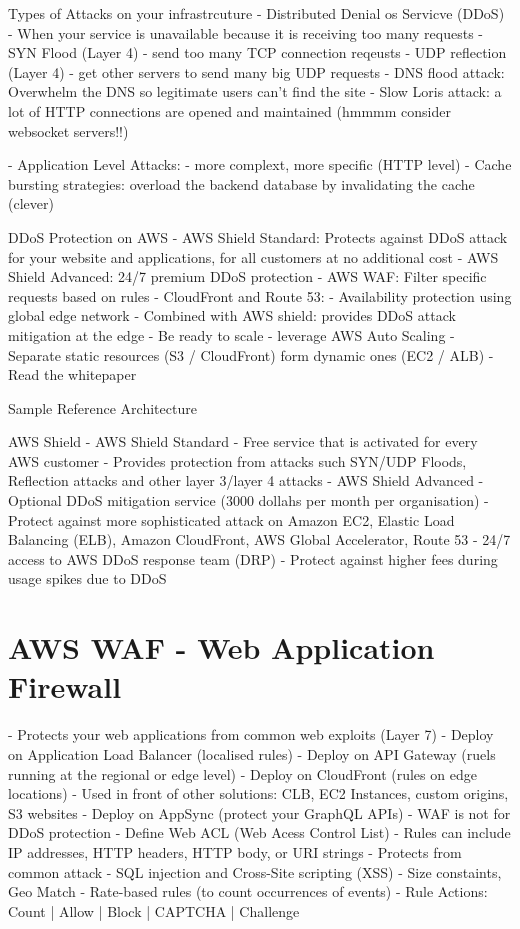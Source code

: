 \documentclass[11pt]{book}
\begin{document}
    Types of Attacks on your infrastrcuture
    - Distributed Denial os Servicve (DDoS)
        - When your service is unavailable because it is receiving too many requests
        - SYN Flood (Layer 4) - send too many TCP connection reqeusts
        - UDP reflection (Layer 4) - get other servers to send many big UDP requests
        - DNS flood attack: Overwhelm the DNS so legitimate users can't find the site
        - Slow Loris attack: a lot of HTTP connections are opened and maintained (hmmmm consider websocket servers!!)

    - Application Level Attacks:
        - more complext, more specific (HTTP level)
        - Cache bursting strategies: overload the backend database by invalidating the cache (clever)

    DDoS Protection on AWS
    - AWS Shield Standard: Protects against DDoS attack for your website and applications, for all customers at no additional cost
    - AWS Shield Advanced: 24/7 premium DDoS protection
    - AWS WAF: Filter specific requests based on rules
    - CloudFront and Route 53:
        - Availability protection using global edge network
        - Combined with AWS shield: provides DDoS attack mitigation at the edge
    - Be ready to scale - leverage AWS Auto Scaling
    - Separate static resources (S3 / CloudFront) form dynamic ones (EC2 / ALB)
    - Read the whitepaper %

    Sample Reference Architecture

    AWS Shield
    - AWS Shield Standard
        - Free service that is activated for every AWS customer
        - Provides protection from attacks such SYN/UDP Floods, Reflection attacks and other layer 3/layer 4 attacks
    - AWS Shield Advanced
        - Optional DDoS mitigation service (3000 dollahs per month per organisation)
        - Protect against more sophisticated attack on Amazon EC2, Elastic Load Balancing (ELB), Amazon CloudFront, AWS Global Accelerator, Route 53
        - 24/7 access to AWS DDoS response team (DRP)
        - Protect against higher fees during usage spikes due to DDoS

    \section{AWS WAF - Web Application Firewall}
    - Protects your web applications from common web exploits (Layer 7)
    - Deploy on Application Load Balancer (localised rules)
    - Deploy on API Gateway (ruels running at the regional or edge level)
    - Deploy on CloudFront (rules on edge locations)
        - Used in front of other solutions: CLB, EC2 Instances, custom origins, S3 websites
    - Deploy on AppSync (protect your GraphQL APIs)
    - WAF is not for DDoS protection
    - Define Web ACL (Web Acess Control List)
        - Rules can include IP addresses, HTTP headers, HTTP body, or URI strings
        - Protects from common attack - SQL injection and Cross-Site scripting (XSS)
        - Size constaints, Geo Match
        - Rate-based rules (to count occurrences of events)
    - Rule Actions: Count | Allow | Block | CAPTCHA | Challenge
\end{document}
